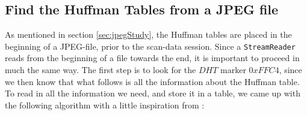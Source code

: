\subsection{Find the Huffman Tables from a JPEG file}
\label{sec:DesignHuffman}
As mentioned in section \ref{sec:jpegStudy}, the Huffman tables are placed in the beginning of a JPEG-file, prior to the scan-data session. 
Since a \lstinline|StreamReader| reads from the beginning of a file towards the end, it is important to proceed in much the same way. 
The first step is to look for the $DHT$ marker $0xFFC4$, since we then know that what follows is all the information about the Huffman table. 
To read in all the information we need, and store it in a table, we came up with the following algorithm with a little inspiration from \cite{HuffmanDecoding}:

